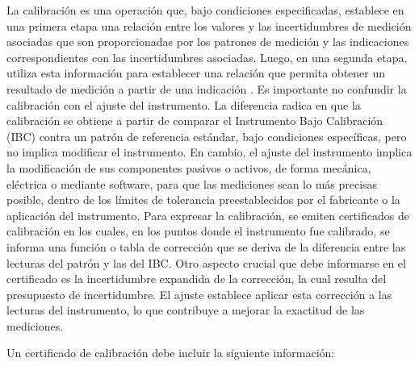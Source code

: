 
La calibración es una operación que, bajo condiciones especificadas, establece en una primera etapa una relación entre los valores y las incertidumbres de medición asociadas que son proporcionadas por los patrones de medición y las indicaciones correspondientes con las incertidumbres asociadas. Luego, en una segunda etapa, utiliza esta información para establecer una relación que permita obtener un resultado de medición a partir de una indicación \cite{VIM}. Es importante no confundir la calibración con el ajuste del instrumento. La diferencia radica en que la calibración se obtiene a partir de comparar el Instrumento Bajo Calibración (IBC) contra un patrón de referencia estándar, bajo condiciones específicas, pero no implica modificar el instrumento. En cambio, el ajuste del instrumento implica la modificación de sus componentes pasivos o activos, de forma mecánica, eléctrica o mediante software, para que las mediciones sean lo más precisas posible, dentro de los límites de tolerancia preestablecidos por el fabricante o la aplicación del instrumento. Para expresar la calibración, se emiten certificados de calibración en los cuales, en los puntos donde el instrumento fue calibrado, se informa una función o tabla de corrección que se deriva de la diferencia entre las lecturas del patrón y las del IBC. Otro aspecto crucial que debe informarse en el certificado es la incertidumbre expandida de la corrección, la cual resulta del presupuesto de incertidumbre. El ajuste establece aplicar esta corrección a las lecturas del instrumento, lo que contribuye a mejorar la exactitud de las mediciones. 

Un certificado de calibración debe incluir la siguiente información:

